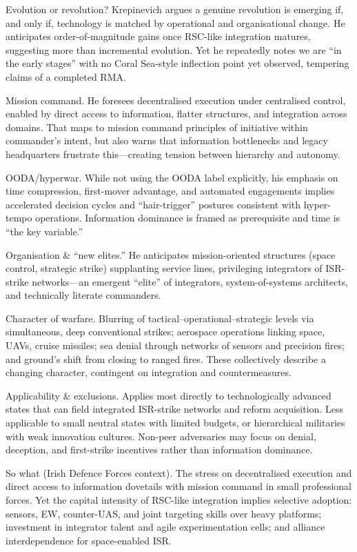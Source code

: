 Evolution or revolution? Krepinevich argues a genuine revolution is emerging if, and only if, technology is matched by operational and organisational change. He anticipates order-of-magnitude gains once RSC-like integration matures, suggesting more than incremental evolution. Yet he repeatedly notes we are “in the early stages” with no Coral Sea-style inflection point yet observed, tempering claims of a completed RMA.

Mission command. He foresees decentralised execution under centralised control, enabled by direct access to information, flatter structures, and integration across domains. That maps to mission command principles of initiative within commander’s intent, but also warns that information bottlenecks and legacy headquarters frustrate this—creating tension between hierarchy and autonomy.

OODA/hyperwar. While not using the OODA label explicitly, his emphasis on time compression, first-mover advantage, and automated engagements implies accelerated decision cycles and “hair-trigger” postures consistent with hyper-tempo operations. Information dominance is framed as prerequisite and time is “the key variable.”

Organisation & “new elites.” He anticipates mission-oriented structures (space control, strategic strike) supplanting service lines, privileging integrators of ISR-strike networks—an emergent “elite” of integrators, system-of-systems architects, and technically literate commanders.

Character of warfare. Blurring of tactical–operational–strategic levels via simultaneous, deep conventional strikes; aerospace operations linking space, UAVs, cruise missiles; sea denial through networks of sensors and precision fires; and ground’s shift from closing to ranged fires. These collectively describe a changing character, contingent on integration and countermeasures.

Applicability & exclusions. Applies most directly to technologically advanced states that can field integrated ISR-strike networks and reform acquisition. Less applicable to small neutral states with limited budgets, or hierarchical militaries with weak innovation cultures. Non-peer adversaries may focus on denial, deception, and first-strike incentives rather than information dominance.

So what (Irish Defence Forces context). The stress on decentralised execution and direct access to information dovetails with mission command in small professional forces. Yet the capital intensity of RSC-like integration implies selective adoption: sensors, EW, counter-UAS, and joint targeting skills over heavy platforms; investment in integrator talent and agile experimentation cells; and alliance interdependence for space-enabled ISR.

